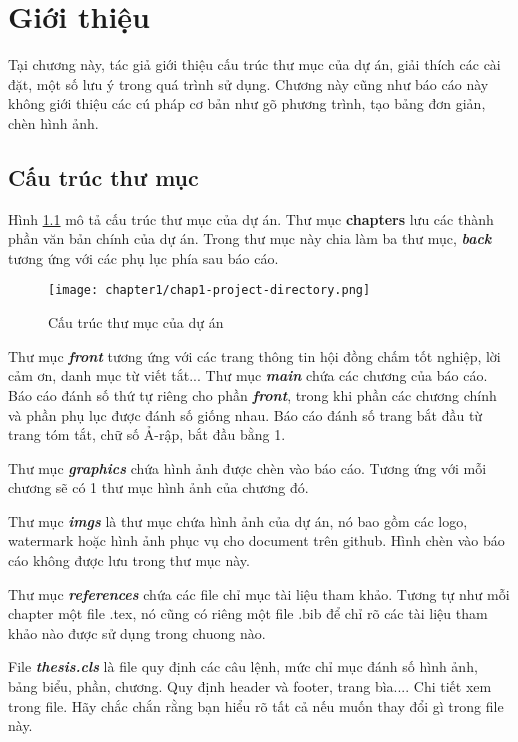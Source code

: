 \chapter{Giới thiệu}
\label{chap:chap1-introduce}

Tại chương này, tác giả giới thiệu cấu trúc thư mục của dự án, giải thích các cài đặt, một số lưu ý trong quá trình sử dụng. Chương này cũng như báo cáo này không giới thiệu các cú pháp cơ bản như gõ phương trình, tạo bảng đơn giản, chèn hình ảnh.

\section{Cấu trúc thư mục}

\indent Hình \ref{fig:chap1-project-directory} mô tả cấu trúc thư mục của dự án. Thư mục \textbf{chapters} lưu các thành phần văn bản chính của dự án. Trong thư mục này chia làm ba thư mục, \textbf{\textit{back}} tương ứng với các phụ lục phía sau báo cáo.

\begin{figure}
    \centering
    \texttt{[image: chapter1/chap1-project-directory.png]}
    \caption{Cấu trúc thư mục của dự án}
    \label{fig:chap1-project-directory}
\end{figure}

Thư mục \textbf{\textit{front}} tương ứng với các trang thông tin hội đồng chấm tốt nghiệp, lời cảm ơn, danh mục từ viết tắt... Thư mục \textbf{\textit{main}} chứa các chương của báo cáo. Báo cáo đánh số thứ tự riêng cho phần \textit{\textbf{front}}, trong khi phần các chương chính và phần phụ lục được đánh số giống nhau. Báo cáo đánh số trang bắt đầu từ trang tóm tắt, chữ số Ả-rập, bắt đầu bằng 1.

Thư mục \textbf{\textit{graphics}} chứa hình ảnh được chèn vào báo cáo. Tương ứng với mỗi chương sẽ có 1 thư mục hình ảnh của chương đó.

Thư mục \textbf{\textit{imgs}} là thư mục chứa hình ảnh của dự án, nó bao gồm các logo, watermark hoặc hình ảnh phục vụ cho document trên github. Hình chèn vào báo cáo không được lưu trong thư mục này.

Thư mục \textbf{\textit{references}} chứa các file chỉ mục tài liệu tham khảo. Tương tự như mỗi chapter một file .tex, nó cũng có riêng một file .bib để chỉ rõ các tài liệu tham khảo nào được sử dụng trong chuong nào.

File \textbf{\textit{thesis.cls}} là file quy định các câu lệnh, mức chỉ mục đánh số hình ảnh, bảng biểu, phần, chương. Quy định header và footer, trang  bìa.... Chi tiết xem trong file. Hãy chắc chắn rằng bạn hiểu rõ tất cả nếu muốn thay đổi gì trong file này.


